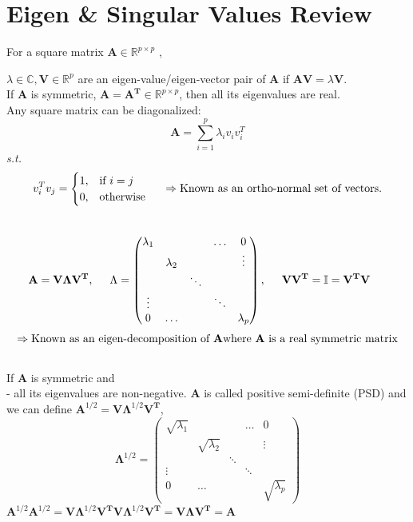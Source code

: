\documentclass[11pt]{report}
\begin{document}
\newpage
\section{Eigen \& Singular Values Review}
For a square matrix $\mathbf{A} \in  \mathbb{R}^{p \times p}$ , 

$\lambda\in\mathbb{C}, \mathbf{V}\in\mathbb{R}^{p}$ are an eigen-value/eigen-vector pair of $\mathbf{A}$ if $\mathbf{AV}=\lambda\mathbf{V}$.  \\

If $\mathbf{A}$ is symmetric, $\mathbf{A} = \mathbf{A^T } \in\mathbb{R}^{p \times p}$, then all its eigenvalues are real. \\

Any square matrix can be diagonalized:
\[\mathbf{A} = \sum_{i=1}^{p} \lambda_i v_iv_i^T \]
\textit{s.t.} 
\[ v_i^T v_j=\begin{cases}
    1, & \text{if $i = j$}\\
    0, & \text{otherwise}
  \end{cases} \hspace{0.5cm}  \Rightarrow \text{Known as an ortho-normal set of vectors.}\]\\
\[\mathbf{A} = \mathbf{V \Lambda V^T}, \hspace{0.5cm} \Lambda= \begin{pmatrix}
\lambda_1  &      &      &   \hdots     &  0    \\
          & \lambda_2  &  &  &      \vdots   \\
          &      & \ddots &  &     \\
  \vdots        & & &\ddots &  \\
  0      &\hdots & & &\lambda_{p}
\end{pmatrix}, \hspace{0.5cm} \mathbf{V V^T}=\mathbb{I}=\mathbf{V^T V} \hspace{0.5cm}\]  
\[\Rightarrow \text{Known as an eigen-decomposition of } \mathbf{A} \text{where \textbf{A} is a real symmetric matrix} \]\\
If $\mathbf{A}$ is symmetric and\\

- all its eigenvalues are non-negative. $\mathbf{A}$ is called positive semi-definite (PSD) and we can define $\mathbf{A}^{1/2} = \mathbf{V\Lambda}^{1/2}\mathbf{V^T}$, 
\[\mathbf{\Lambda}^{1/2} = \begin{pmatrix}
\sqrt{\lambda_1}  &      &      &   \hdots     &  0    \\
          & \sqrt{\lambda_2}  &  &  &      \vdots   \\
          &      & \ddots &  &     \\
  \vdots        & & &\ddots &  \\
  0      &\hdots & & &\sqrt{\lambda_p}
\end{pmatrix}\]
$\mathbf{A}^{1/2}\mathbf{A}^{1/2} = \mathbf{V\Lambda}^{1/2}\mathbf{V^T}\mathbf{V\Lambda}^{1/2}\mathbf{V^T} = \mathbf{V\Lambda}\mathbf{V^T} = \mathbf{A}$\\
\end{document}
